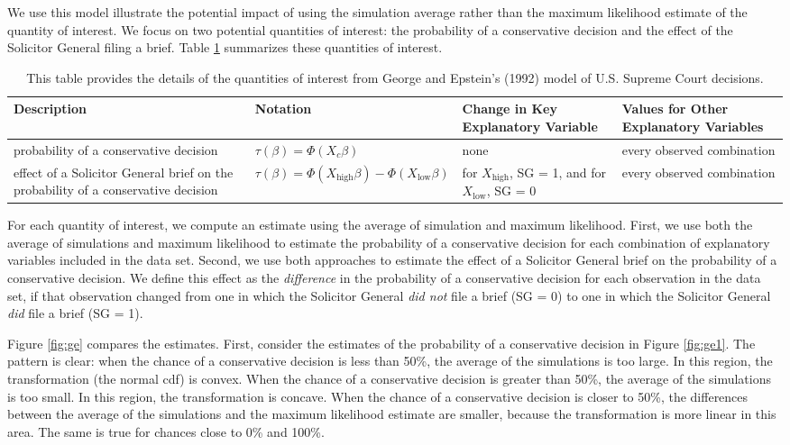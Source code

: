 \documentclass[11pt]{article}
\begin{document}
We use this model illustrate the potential impact of using the simulation average rather than the maximum likelihood estimate of the quantity of interest.
We focus on two potential quantities of interest: the probability of a conservative decision and the effect of the Solicitor General filing a brief.
Table \ref{tab:ge-qi} summarizes these quantities of interest.

\begin{table}[h!]
\centering
\caption{This table provides the details of the quantities of interest from George and Epstein's (1992) model of U.S. Supreme Court decisions.}
\label{tab:ge-qi}
\footnotesize
\begin{tabular}{@{} m{5cm} m{4cm} m{2.5cm}m{4cm}@{}}
\toprule
Description                                                                       & Notation                                                  & Change in Key Explanatory Variable               & Values for Other Explanatory Variables \\ \midrule
probability of a conservative decision                                            & $\tau(\beta) = \Phi(X_c \beta)$                           & none                                             & every observed combination   \\\hline
effect of a Solicitor General brief on the probability of a conservative decision & $\tau(\beta) = \Phi(X_\text{high} \beta) - \Phi(X_\text{low}\beta)$ & for $X_\text{high}$, SG = 1, and for $X_\text{low}$, SG = 0 & every observed combination   \\ \bottomrule
\end{tabular}
\end{table}

For each quantity of interest, we compute an estimate using the average of simulation and maximum likelihood.
First, we use both the average of simulations and maximum likelihood to estimate the probability of a conservative decision for each combination of explanatory variables included in the data set.
Second, we use both approaches to estimate the effect of a Solicitor General brief on the probability of a conservative decision.
We define this effect as the \textit{difference} in the probability of a conservative decision for each observation in the data set, if that observation changed from one in which the Solicitor General \emph{did not} file a brief (SG = 0) to one in which the Solicitor General \emph{did} file a brief (SG = 1).

Figure \ref{fig:ge} compares the estimates.
First, consider the estimates of the probability of a conservative decision in Figure \ref{fig:ge1}.
The pattern is clear: when the chance of a conservative decision is less than 50\%, the average of the simulations is too large.
In this region, the transformation (the normal cdf) is convex.
When the chance of a conservative decision is greater than 50\%, the average of the simulations is too small.
In this region, the transformation is concave.
When the chance of a conservative decision is closer to 50\%, the differences between the average of the simulations and the maximum likelihood estimate are smaller, because the transformation is more linear in this area.
The same is true for chances close to 0\% and 100\%.
\end{document}
